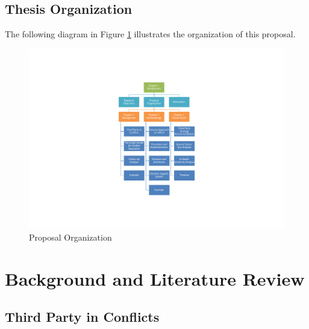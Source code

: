 \documentclass[letterpaper,12pt,titlepage,oneside,final]{book}
\begin{document}
\section{Thesis Organization}

The following diagram in Figure \ref{fig:proposal} illustrates the organization of this proposal.

\begin{center}
\begin{figure}[h!]
\centering
\includegraphics[scale=1]{PDF-IMG/proposalorganization.pdf}

\caption{Proposal Organization}

\label{fig:proposal}
\end{figure}
\end{center}





\chapter{Background and Literature Review}




\section{Third Party in Conflicts}

\end{document}
